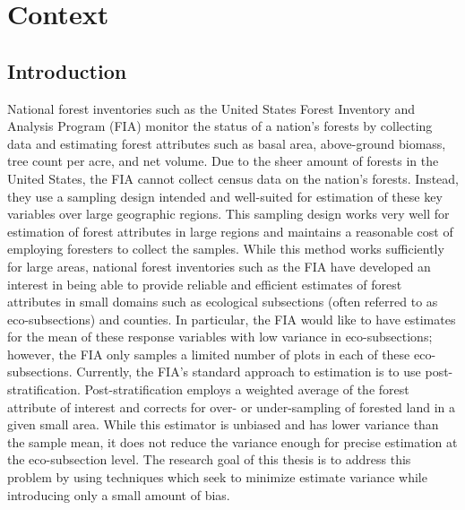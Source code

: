 \documentclass[12pt,twoside]{reedthesis}
\begin{document}
\hypertarget{context}{%
\chapter{Context}\label{context}}

\hypertarget{introduction}{%
\section{Introduction}\label{introduction}}

National forest inventories such as the United States Forest Inventory and Analysis Program (FIA) monitor the status of a nation's forests by collecting data and estimating forest attributes such as basal area, above-ground biomass, tree count per acre, and net volume. Due to the sheer amount of forests in the United States, the FIA cannot collect census data on the nation's forests. Instead, they use a sampling design intended and well-suited for estimation of these key variables over large geographic regions. This sampling design works very well for estimation of forest attributes in large regions and maintains a reasonable cost of employing foresters to collect the samples. While this method works sufficiently for large areas, national forest inventories such as the FIA have developed an interest in being able to provide reliable and efficient estimates of forest attributes in small domains such as ecological subsections (often referred to as eco-subsections) and counties. In particular, the FIA would like to have estimates for the mean of these response variables with low variance in eco-subsections; however, the FIA only samples a limited number of plots in each of these eco-subsections. Currently, the FIA's standard approach to estimation is to use post-stratification. Post-stratification employs a weighted average of the forest attribute of interest and corrects for over- or under-sampling of forested land in a given small area. While this estimator is unbiased and has lower variance than the sample mean, it does not reduce the variance enough for precise estimation at the eco-subsection level. The research goal of this thesis is to address this problem by using techniques which seek to minimize estimate variance while introducing only a small amount of bias.
\end{document}
